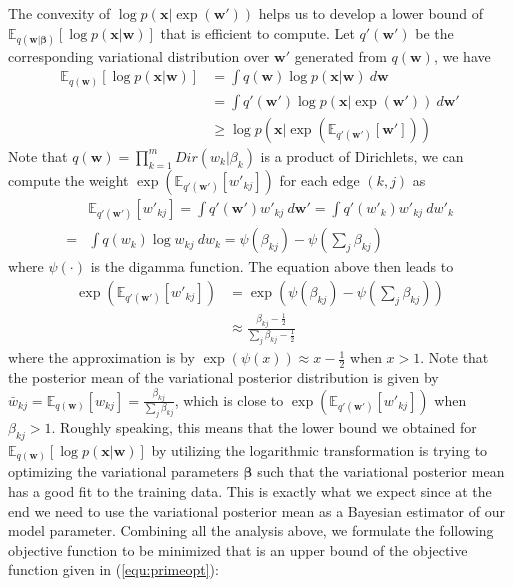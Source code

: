\documentclass{article} %
\theoremstyle{definition}
\begin{document}
The convexity of $\log p(\mathbf{x}|\exp(\mathbf{w}'))$ helps us to develop a lower bound of $\mathbb{E}_{q(\mathbf{w}|\pmb\beta)}[\log p(\mathbf{x}|\mathbf{w})]$ that is efficient to compute. Let $q'(\mathbf{w}')$ be the corresponding variational distribution over $\mathbf{w}'$ generated from $q(\mathbf{w})$, we have
\begin{align*}
\mathbb{E}_{q(\mathbf{w})}[\log p(\mathbf{x}|\mathbf{w})] & = \int q(\mathbf{w}) \log p(\mathbf{x}|\mathbf{w})~d\mathbf{w} \\
& = \int q'(\mathbf{w}') \log p(\mathbf{x}|\exp(\mathbf{w}'))~d\mathbf{w}' \\
& \geq \log p(\mathbf{x}|\exp(\mathbb{E}_{q'(\mathbf{w}')}[\mathbf{w}']))
\end{align*}
Note that $q(\mathbf{w}) = \prod_{k=1}^m Dir(w_k | \beta_k)$ is a product of Dirichlets, we can compute the weight $\exp\left(\mathbb{E}_{q'(\mathbf{w}')}[w'_{kj}]\right)$ for each edge $(k,j)$ as
\begin{align}
& \mathbb{E}_{q'(\mathbf{w}')}[w'_{kj}] = \int q'(\mathbf{w}') w'_{kj}~d\mathbf{w}' = \int q'(w'_k) w'_{kj}~dw'_k \nonumber\\
 = & \int q(w_k)\log w_{kj}~dw_k = \psi(\beta_{kj}) - \psi(\sum_j\beta_{kj})
\end{align}
where $\psi(\cdot)$ is the digamma function. The equation above then leads to 
\begin{align}
\exp\left(\mathbb{E}_{q'(\mathbf{w}')}[w'_{kj}]\right) & = \exp\left(\psi(\beta_{kj}) - \psi(\sum_j\beta_{kj})\right)\nonumber\\
& \approx\frac{\beta_{kj}-\frac{1}{2}}{\sum_{j}\beta_{kj}-\frac{1}{2}}
\label{equ:initw}
\end{align}
where the approximation is by $\exp(\psi(x))\approx x-\frac{1}{2}$ when $x>1$. Note that the posterior mean of the variational posterior distribution is given by $\bar{w}_{kj} = \mathbb{E}_{q(\mathbf{w})}[w_{kj}] = \frac{\beta_{kj}}{\sum_j\beta_{kj}}$, which is close to $\exp\left(\mathbb{E}_{q'(\mathbf{w}')}[w'_{kj}]\right)$ when $\beta_{kj} > 1$. Roughly speaking, this means that the lower bound we obtained for $\mathbb{E}_{q(\mathbf{w})}[\log p(\mathbf{x}|\mathbf{w})]$ by utilizing the logarithmic transformation is trying to optimizing the variational parameters $\pmb\beta$ such that the variational posterior mean has a good fit to the training data. This is exactly what we expect since at the end we need to use the variational posterior mean as a Bayesian estimator of our model parameter. Combining all the analysis above, we formulate the following objective function to be minimized that is an upper bound of the objective function given in (\ref{equ:primeopt}):
\end{document}
